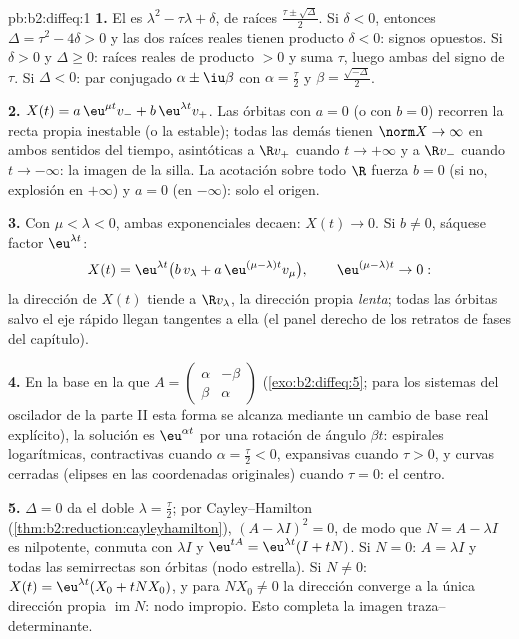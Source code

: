 \begin{solution}{pb:b2:diffeq:1}
\textbf{1.} El  es $\lambda^2 - \tau\lambda +
\delta$, de raíces $\frac{\tau\pm\sqrt\Delta}{2}$. Si $\delta < 0$,
entonces $\Delta = \tau^2 - 4\delta > 0$ y las dos raíces reales
tienen producto $\delta < 0$: signos opuestos. Si $\delta > 0$ y
$\Delta \geq 0$: raíces reales de producto $> 0$ y suma $\tau$, luego
ambas del signo de $\tau$. Si $\Delta < 0$: par conjugado $\alpha \pm
\iu\beta$ con $\alpha = \frac\tau2$ y $\beta =
\frac{\sqrt{-\Delta}}2$.

\textbf{2.} $X(t) = a\,\eu^{\mu t}v_- + b\,\eu^{\lambda t}v_+$. Las
órbitas con $a = 0$ (o con $b = 0$) recorren la recta propia
inestable (o la estable); todas las demás tienen $\norm X \to \infty$
en ambos sentidos del tiempo, asintóticas a $\R v_+$ cuando $t \to
+\infty$ y a $\R v_-$ cuando $t \to -\infty$: la imagen de la silla.
La acotación sobre todo $\R$ fuerza $b = 0$ (si no, explosión en
$+\infty$) y $a = 0$ (en $-\infty$): solo el origen.

\textbf{3.} Con $\mu < \lambda < 0$, ambas exponenciales decaen:
$X(t) \to 0$. Si $b \neq 0$, sáquese factor $\eu^{\lambda t}$:
\[
X(t) = \eu^{\lambda t}\bigl(b\,v_\lambda + a\,\eu^{(\mu -
\lambda)t}v_\mu\bigr),
\qquad \eu^{(\mu-\lambda)t} \to 0 :
\]
la dirección de $X(t)$ tiende a $\R v_\lambda$, la dirección propia
\emph{lenta}; todas las órbitas salvo el eje rápido llegan tangentes
a ella (el panel derecho de los retratos de fases del capítulo).

\textbf{4.} En la base en la que $A = \begin{pmatrix} \alpha &
-\beta\\ \beta & \alpha\end{pmatrix}$ (\cref{exo:b2:diffeq:5}; para
los sistemas del oscilador de la parte II esta forma se alcanza
mediante un cambio de base real explícito), la solución es
$\eu^{\alpha t}$ por una rotación de ángulo $\beta t$: espirales
logarítmicas, contractivas cuando $\alpha = \frac\tau2 < 0$,
expansivas cuando $\tau > 0$, y curvas cerradas (elipses en las
coordenadas originales) cuando $\tau = 0$: el centro.

\textbf{5.} $\Delta = 0$ da el  doble $\lambda =
\frac\tau2$; por Cayley--Hamilton
(\cref{thm:b2:reduction:cayleyhamilton}), $(A - \lambda I)^2 = 0$, de
modo que $N = A - \lambda I$ es nilpotente, conmuta con $\lambda I$ y
$\eu^{tA} = \eu^{\lambda t}(I + tN)$. Si $N = 0$: $A = \lambda I$ y
todas las semirrectas son órbitas (nodo estrella). Si $N \neq 0$:
$X(t) = \eu^{\lambda t}(X_0 + tNX_0)$, y para $NX_0 \neq 0$ la
dirección converge a la única dirección propia
$\operatorname{im}N$: nodo impropio. Esto completa la imagen
traza--determinante.


\end{solution}
